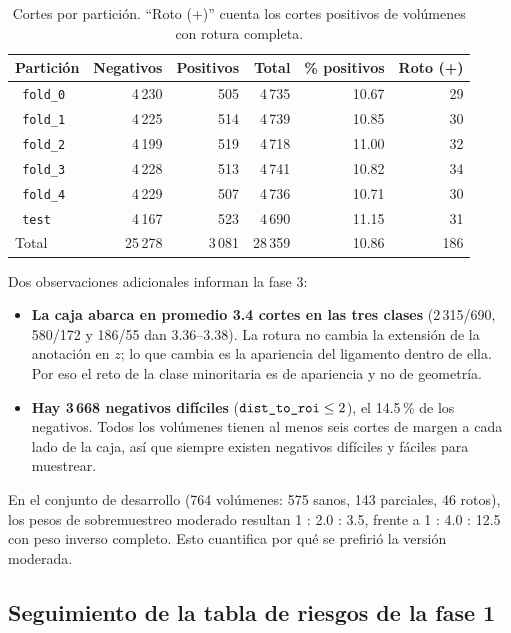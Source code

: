 \documentclass[12pt,letterpaper]{article}
\newcommand{\code}[1]{\texttt{\hyphenchar\font=-1 #1}}
\begin{document}
\begin{table}[!htbp]
\centering
\small
\caption{Cortes por partición. ``Roto (+)'' cuenta los cortes positivos de volúmenes con rotura completa.}
\label{tab:slices}
\begin{tabular}{lrrrrr}
\toprule
Partición & Negativos & Positivos & Total & \% positivos & Roto (+) \\
\midrule
\code{fold\_0} & 4\,230 & 505 & 4\,735 & 10.67 & 29 \\
\code{fold\_1} & 4\,225 & 514 & 4\,739 & 10.85 & 30 \\
\code{fold\_2} & 4\,199 & 519 & 4\,718 & 11.00 & 32 \\
\code{fold\_3} & 4\,228 & 513 & 4\,741 & 10.82 & 34 \\
\code{fold\_4} & 4\,229 & 507 & 4\,736 & 10.71 & 30 \\
\code{test}    & 4\,167 & 523 & 4\,690 & 11.15 & 31 \\
\midrule
Total & 25\,278 & 3\,081 & 28\,359 & 10.86 & 186 \\
\bottomrule
\end{tabular}
\end{table}

Dos observaciones adicionales informan la fase 3:

\begin{itemize}[leftmargin=*]
  \item \textbf{La caja abarca en promedio 3.4 cortes en las tres clases} (2\,315/690, 580/172 y 186/55 dan 3.36--3.38). La rotura no cambia la extensión de la anotación en $z$; lo que cambia es la apariencia del ligamento dentro de ella. Por eso el reto de la clase minoritaria es de apariencia y no de geometría.
  \item \textbf{Hay 3\,668 negativos difíciles} ($\code{dist\_to\_roi}\le 2$), el 14.5\,\% de los negativos. Todos los volúmenes tienen al menos seis cortes de margen a cada lado de la caja, así que siempre existen negativos difíciles y fáciles para muestrear.
\end{itemize}

\noindent En el conjunto de desarrollo (764 volúmenes: 575 sanos, 143 parciales, 46 rotos), los pesos de sobremuestreo moderado resultan 1 : 2.0 : 3.5, frente a 1 : 4.0 : 12.5 con peso inverso completo. Esto cuantifica por qué se prefirió la versión moderada.

\subsection{Seguimiento de la tabla de riesgos de la fase 1}
\end{document}
